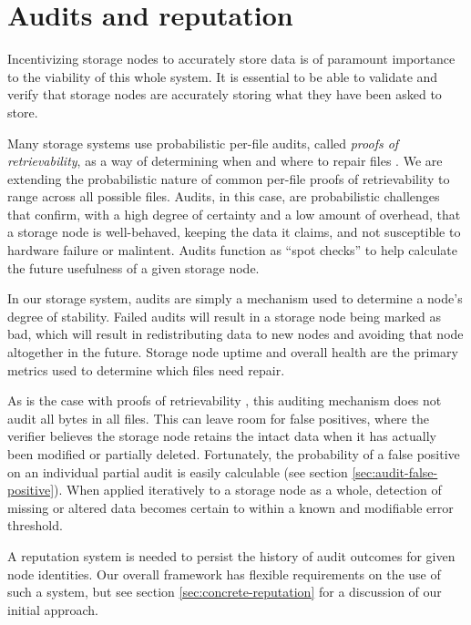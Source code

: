 \documentclass[8pt,fleqn,openany]{book}
\begin{document}
\section{Audits and reputation}\label{sec:framework-audits}

Incentivizing storage nodes to accurately store data is of paramount importance
to
the viability of this whole system. It is essential to be able to
validate and verify that storage nodes are accurately storing what they have
been
asked to store.

Many storage systems use probabilistic per-file audits, called
{\em proofs of retrievability}, as a way of determining
when and where to repair files \cite{juels, shacham}.
We are extending the probabilistic nature of common per-file
proofs of retrievability to range across all possible files.
Audits, in this case, are probabilistic challenges that confirm, with a high
degree of certainty and a low amount of overhead, that a storage node is
well-behaved, keeping the data it claims, and not susceptible to hardware
failure or malintent. Audits function as ``spot checks'' \cite{juels2} to help
calculate the future usefulness of a given storage node.

In our storage system,
audits are simply a mechanism used to determine a node's degree of stability.
Failed audits will result in a storage node being marked as bad, which
will result in redistributing data to new nodes and avoiding that node altogether
in the future. Storage node uptime and overall health are the primary metrics
used to determine which files need repair.

As is the case with proofs of retrievability \cite{juels, shacham},
this auditing mechanism does not audit all bytes in all files. This can
leave room for false positives, where the verifier believes the storage node
retains the intact data when it has actually been modified or partially
deleted. Fortunately, the probability of a false positive on an individual
partial audit is easily calculable (see section
\ref{sec:audit-false-positive}). When applied
iteratively to a storage node as a whole, detection of missing or altered data
becomes certain to within a known and modifiable error threshold.

A reputation system is needed to persist the history of audit outcomes for
given node identities. Our overall framework has flexible requirements on the use
of such a system, but see section \ref{sec:concrete-reputation} for a
discussion of our initial approach.
\end{document}
